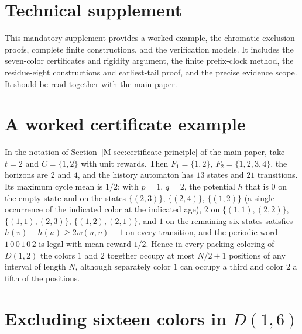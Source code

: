 \documentclass[11pt,reqno]{amsart}
\theoremstyle{plain}
\newcommand{\D}[1]{D(1,#1)}
\theoremstyle{plain}
\theoremstyle{plain}
\providecommand{\MainPrefix}{}
\providecommand{\SuppPrefix}{}
\begin{document}
\clearpage
\hypertarget{supplement-start}{}
\setcounter{section}{0}\setcounter{subsection}{0}
\setcounter{equation}{0}
\setcounter{table}{0}\setcounter{figure}{0}
\renewcommand{\MainPrefix}{Main }\renewcommand{\SuppPrefix}{}
\section*{Technical supplement}
This mandatory supplement provides a worked example, the chromatic exclusion proofs, complete finite constructions, and the verification models. It includes the seven-color certificates and rigidity argument, the finite prefix-clock method, the residue-eight constructions and earliest-tail proof, and the precise evidence scope. It should be read together with the main paper.


\renewcommand{\thesection}{S\arabic{section}}
\renewcommand{\theStheorem}{S\arabic{Stheorem}}
\renewcommand{\theequation}{S\arabic{equation}}
\renewcommand{\thetable}{S\arabic{table}}

\section{A worked certificate example}\label{S-supp:worked-example}
In the notation of Section~\ref*{M-sec:certificate-principle} of the main paper, take $t=2$ and $C=\{1,2\}$ with unit rewards. Then $F_1=\{1,2\}$,
$F_2=\{1,2,3,4\}$, the horizons are $2$ and $4$, and the history automaton has $13$ states and
$21$ transitions. Its maximum cycle mean is $1/2$: with $p=1$, $q=2$, the potential $h$ that is
$0$ on the empty state and on the states $\{(2,3)\}$, $\{(2,4)\}$, $\{(1,2)\}$ (a single occurrence
of the indicated color at the indicated age), $2$ on $\{(1,1),(2,2)\}$, $\{(1,1),(2,3)\}$,
$\{(1,2),(2,1)\}$, and $1$ on the remaining six states satisfies $h(v)-h(u)\ge 2w(u,v)-1$ on every
transition, and the periodic word $1\,0\,0\,1\,0\,2$ is legal with mean reward $1/2$. Hence in every
packing coloring of $\D{2}$ the colors $1$ and $2$ together occupy at most $N/2+1$ positions of any
interval of length $N$, although separately color $1$ can occupy a third and color $2$ a fifth of
the positions.

\section{Excluding sixteen colors in \texorpdfstring{$\D{6}$}{D(1,6)}}\label{S-supp:d6-lower}
\end{document}
